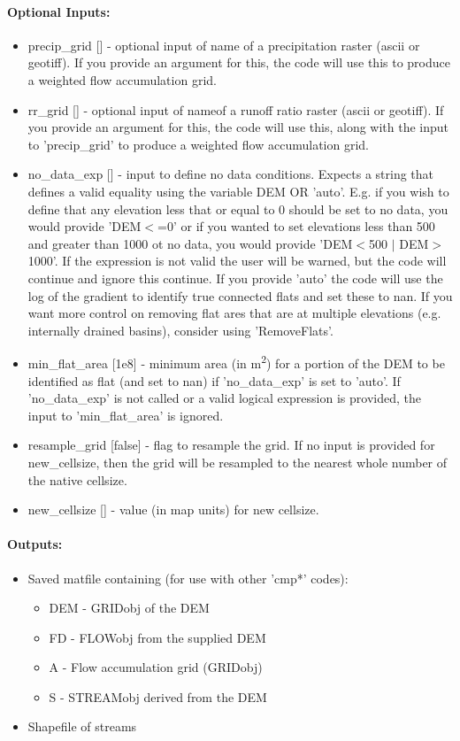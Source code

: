 \paragraph{Optional Inputs:}
\begin{itemize}
\item precip\_grid [] - optional input of name of a precipitation raster (ascii or geotiff). If you provide an argument for this, 
the code will use this to produce a weighted flow accumulation grid.
\item rr\_grid [] - optional input of nameof a runoff ratio raster (ascii or geotiff). If you provide an argument for this, the code 
will use this, along with the input to 'precip\_grid' to produce a weighted flow accumulation grid.
\item no\_data\_exp [] - input to define no data conditions. Expects a string that defines a valid equality using
the variable DEM OR 'auto'. E.g. if you wish to define that any elevation less that or equal to 0 should 
be set to no data, you would provide 'DEM$<$=0' or if you wanted to set elevations less than 500 and greater  
than 1000 ot no data, you would provide 'DEM$<$500 $|$ DEM$>$1000'. If the expression is not valid the user will be
warned, but the code will continue and ignore this continue. If you provide 'auto' the code will use the log 
of the gradient to identify true connected flats and set these to nan. If you want more control on removing flat 
ares that are at multiple elevations (e.g. internally drained basins), consider using 'RemoveFlats'. 
\item min\_flat\_area [1e8] - minimum area (in m\textsuperscript{2}) for a portion of the DEM to be identified as flat (and set to nan) if 'no\_data\_exp'
is set to 'auto'. If 'no\_data\_exp' is not called or a valid logical expression is provided, the input to 'min\_flat\_area'
is ignored.
\item resample\_grid [false] - flag to resample the grid. If no input is provided for new\_cellsize, then the
grid will be resampled to the nearest whole number of the native cellsize.
\item new\_cellsize [] - value (in map units) for new cellsize.
\end{itemize}

\paragraph{Outputs:}
\begin{itemize}
\item Saved matfile containing (for use with other 'cmp*' codes):
\begin{itemize}
\item DEM - GRIDobj of the DEM
\item FD - FLOWobj from the supplied DEM
\item A - Flow accumulation grid (GRIDobj)
\item S - STREAMobj derived from the DEM
\end{itemize}
\item Shapefile of streams
\end{itemize}

